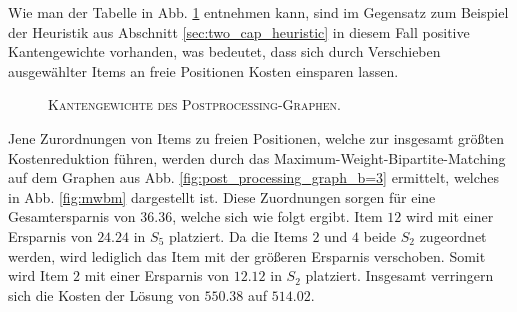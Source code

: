 Wie man der Tabelle in Abb. \ref{fig:post_processing_costs} entnehmen kann, sind im Gegensatz zum Beispiel
der Heuristik aus Abschnitt \ref{sec:two_cap_heuristic} in diesem Fall positive Kantengewichte vorhanden,
was bedeutet, dass sich durch Verschieben ausgewählter Items an freie Positionen Kosten einsparen lassen.

\vfill
\pagebreak

\begin{figure}[H]
\centering
{}
\caption{\textsc{Kantengewichte des Postprocessing-Graphen}.}
\label{fig:post_processing_costs}
\end{figure}

Jene Zurordnungen von Items zu freien Positionen, welche zur insgesamt größten Kostenreduktion führen, werden durch
das Maximum-Weight-Bipartite-Matching auf dem Graphen aus Abb. \ref{fig:post_processing_graph_b=3} ermittelt,
welches in Abb. \ref{fig:mwbm} dargestellt ist.
Diese Zuordnungen sorgen für eine Gesamtersparnis von $36.36$, welche sich wie folgt ergibt.
Item $12$ wird mit einer Ersparnis von $24.24$ in $S_5$ platziert. Da die Items $2$ und $4$ beide $S_2$ zugeordnet werden,
wird lediglich das Item mit der größeren Ersparnis verschoben. Somit wird Item $2$ mit einer Ersparnis von $12.12$
in $S_2$ platziert. Insgesamt verringern sich die Kosten der Lösung von $550.38$ auf $514.02$.

